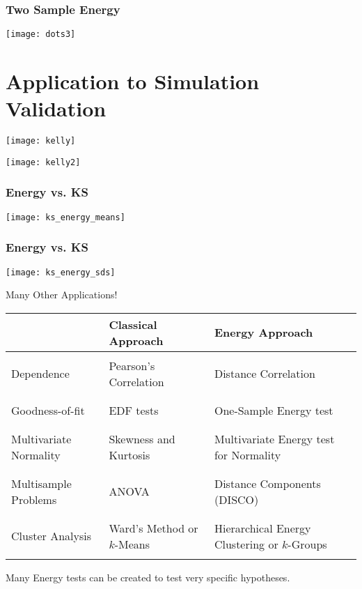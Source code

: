 \documentclass[presentation]{beamer}
\begin{document}
\begin{frame}
  \frametitle{Two Sample Energy}
  \begin{center}
    \texttt{[image: dots3]}
  \end{center}
\end{frame}

\section{Application to Simulation Validation}

\begin{frame}
  \texttt{[image: kelly]}
\end{frame}

\begin{frame}
  \texttt{[image: kelly2]}
\end{frame}

\begin{frame}
  \frametitle{Energy vs. KS}
  \texttt{[image: ks\_energy\_means]} 
\end{frame}


\begin{frame}
  \frametitle{Energy vs. KS}
  \texttt{[image: ks\_energy\_sds]} 
\end{frame}


\begin{frame}{Many Other Applications!}
  \fontsize{7pt}{7.2}\selectfont
  \begin{tabular}[c]{lll}
    \hline
    & \textbf{Classical Approach} & \textbf{Energy Approach} \\
    \hline
    \\
    Dependence & Pearson's Correlation & Distance Correlation \\
    \\
    \hline
    \\
    Goodness-of-fit & EDF tests & One-Sample Energy test \\
    \\
    \hline
    \\
    Multivariate Normality & Skewness and Kurtosis & Multivariate Energy test for Normality \\
    \\
    \hline
    \\
    Multisample Problems & ANOVA & Distance Components (DISCO) \\
    \\
    \hline
    \\
    Cluster Analysis & Ward's Method or $k$-Means & Hierarchical Energy Clustering or $k$-Groups\\
    \\
    \hline
  \end{tabular}
  \begin{block}{}
    Many Energy tests can be created to test very specific hypotheses.
  \end{block}
\end{frame}
\end{document}
